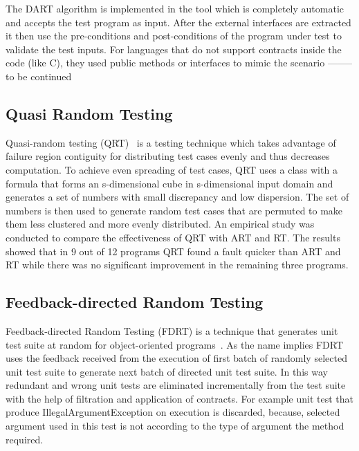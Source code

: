 The DART algorithm is implemented in the tool which is completely automatic and accepts the test program as input. After the external interfaces are extracted it then use the pre-conditions and post-conditions of the program under test to validate the test inputs. For languages that do not support contracts inside the code (like C), they used public methods or interfaces to mimic the scenario -------- to be continued

\subsection{Quasi Random Testing}
Quasi-random testing (QRT)~\cite{Chen2005} is a testing technique which takes advantage of failure region contiguity for distributing test cases evenly and thus decreases computation. %
To achieve even spreading of test cases, QRT uses a class with a formula that forms an s-dimensional cube in s-dimensional input domain and generates a set of numbers with small discrepancy and low dispersion. The set of numbers is then used to generate random test cases that are permuted to make them less clustered and more evenly distributed. An empirical study was conducted to compare the effectiveness of QRT with ART and RT. The results showed that in 9 out of 12 programs QRT found a fault quicker than ART and RT while there was no significant improvement in the remaining three programs.


\subsection{Feedback-directed Random Testing}
Feedback-directed Random Testing (FDRT) is a technique that generates unit test suite at random for object-oriented programs~\cite{Pacheco2007}. As the name implies FDRT uses the feedback received from the execution of first batch of randomly selected unit test suite to generate next batch of directed unit test suite. In this way redundant  and wrong unit tests are eliminated incrementally from the test suite with the help of filtration and application of contracts. For example unit test that produce IllegalArgumentException on execution is discarded, because, selected argument used in this test is not according to the type of argument the method required. 

